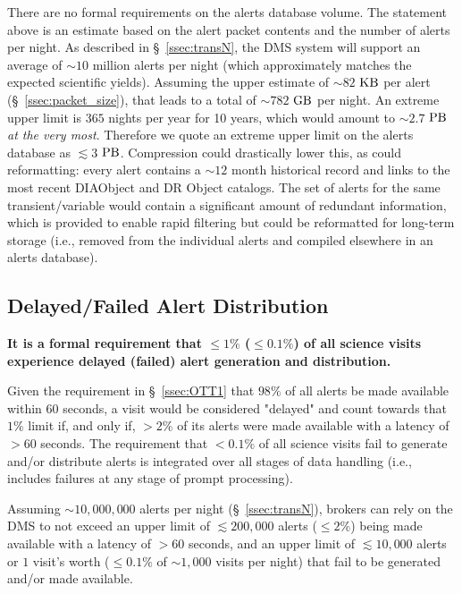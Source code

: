 \documentclass[DM,authoryear,toc]{lsstdoc}
\begin{document}
There are no formal requirements on the alerts database volume. The statement above is an estimate based on the alert packet contents and the number of alerts per night. As described in \S~\ref{ssec:transN}, the DMS system will support an average of $\sim10$ million alerts per night (which approximately matches the expected scientific yields). Assuming the upper estimate of $\sim82$ $\rm KB$ per alert (\S~\ref{ssec:packet_size}), that leads to a total of $\sim782$ $\rm GB$ per night. An extreme upper limit is $365$ nights per year for 10 years, which would amount to $\sim2.7$ $\rm PB$ {\it at the very most}. Therefore we quote an extreme upper limit on the alerts database as $\lesssim3$ $\rm PB$. Compression could drastically lower this, as could reformatting: every alert contains a $\sim12$ month historical record and links to the most recent DIAObject and DR Object catalogs. The set of alerts for the same transient/variable would contain a significant amount of redundant information, which is provided to enable rapid filtering but could be reformatted for long-term storage (i.e., removed from the individual alerts and compiled elsewhere in an alerts database). 


\subsection{Delayed/Failed Alert Distribution}\label{ssec:OTR1}

{\bf It is a formal requirement that $\leq1\%$ ($\leq0.1\%$) of all science visits experience delayed (failed) alert generation and distribution.}

Given the requirement in \S~\ref{ssec:OTT1} that $98\%$ of all alerts be made available within $60$ seconds, a visit would be considered "delayed" and count towards that $1\%$ limit if, and only if, $>2\%$ of its alerts were made available with a latency of $>60$ seconds. The requirement that $<0.1\%$ of all science visits fail to generate and/or distribute alerts is integrated over all stages of data handling (i.e., includes failures at any stage of prompt processing).

Assuming $\sim10,000,000$ alerts per night (\S~\ref{ssec:transN}), brokers can rely on the DMS to not exceed an upper limit of $\lesssim 200,000$ alerts ($\leq 2\%$) being made available with a latency of $>60$ seconds, and an upper limit of $\lesssim 10,000$ alerts or $1$ visit's worth ($\leq0.1\%$ of $\sim1,000$ visits per night) that fail to be generated and/or made available.
\end{document}
